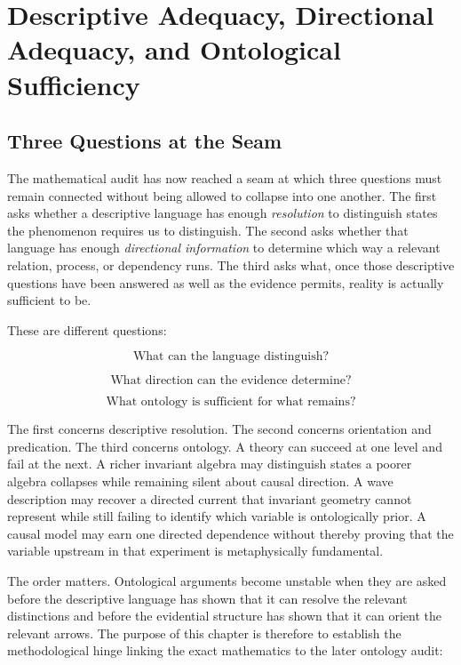 \chapter{Descriptive Adequacy, Directional Adequacy, and Ontological Sufficiency}

\section{Three Questions at the Seam}

The mathematical audit has now reached a seam at which three questions must remain connected without being allowed to collapse into one another. The first asks whether a descriptive language has enough \emph{resolution} to distinguish states the phenomenon requires us to distinguish. The second asks whether that language has enough \emph{directional information} to determine which way a relevant relation, process, or dependency runs. The third asks what, once those descriptive questions have been answered as well as the evidence permits, reality is actually sufficient to be.

These are different questions:

\[
\boxed{
\text{What can the language distinguish?}
}
\]

\[
\boxed{
\text{What direction can the evidence determine?}
}
\]

\[
\boxed{
\text{What ontology is sufficient for what remains?}
}
\]

The first concerns descriptive resolution. The second concerns orientation and predication. The third concerns ontology. A theory can succeed at one level and fail at the next. A richer invariant algebra may distinguish states a poorer algebra collapses while remaining silent about causal direction. A wave description may recover a directed current that invariant geometry cannot represent while still failing to identify which variable is ontologically prior. A causal model may earn one directed dependence without thereby proving that the variable upstream in that experiment is metaphysically fundamental.

The order matters. Ontological arguments become unstable when they are asked before the descriptive language has shown that it can resolve the relevant distinctions and before the evidential structure has shown that it can orient the relevant arrows. The purpose of this chapter is therefore to establish the methodological hinge linking the exact mathematics to the later ontology audit:

